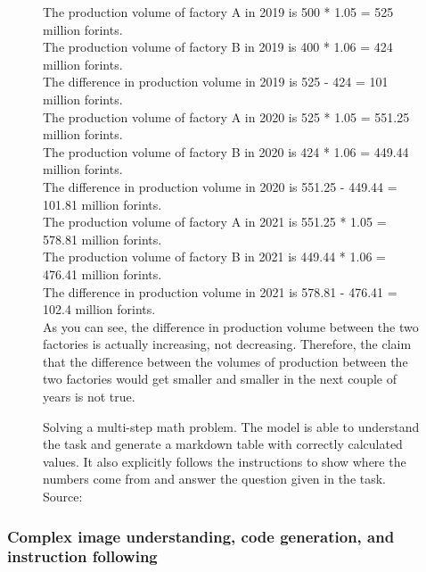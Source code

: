 \begin{figure}[!h]
\begin{tcolorbox}[nobeforeafter, title=Model Response (rendered Markdown), colframe=darkgray, colback=white]
The production volume of factory A in 2019 is 500 * 1.05 = 525 million forints.\\
The production volume of factory B in 2019 is 400 * 1.06 = 424 million forints.\\
The difference in production volume in 2019 is 525 - 424 = 101 million forints.\\

The production volume of factory A in 2020 is 525 * 1.05 = 551.25 million forints.\\
The production volume of factory B in 2020 is 424 * 1.06 = 449.44 million forints.\\
The difference in production volume in 2020 is 551.25 - 449.44 = 101.81 million forints.\\

The production volume of factory A in 2021 is 551.25 * 1.05 = 578.81 million forints.\\
The production volume of factory B in 2021 is 449.44 * 1.06 = 476.41 million forints.\\
The difference in production volume in 2021 is 578.81 - 476.41 = 102.4 million forints.\\

As you can see, the difference in production volume between the two factories is actually increasing, not decreasing. Therefore, the claim that the difference between the volumes of production between the two factories would get smaller and smaller in the next couple of years is not true.

\end{tcolorbox}

\caption{Solving a multi-step math problem. The model is able to understand the task and generate a markdown table with correctly calculated values. It also explicitly follows the instructions to show where the numbers come from and answer the question given in the task. \newline Source: \citet[p.~20]{oktatasi2023matematika}}
\label{fig:demo_example14}
\end{figure}

\clearpage


\subsubsection{Complex image understanding, code generation, and instruction following}
\vspace{-5mm}

